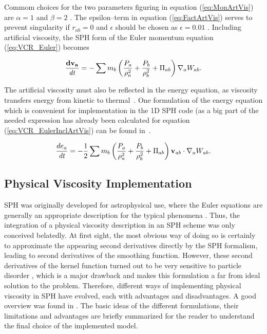 \documentclass{report}
\begin{document}
Commom choices for the two parameters figuring in equation (\ref{eq:MonArtVis}) are $\alpha=1$ and $\beta=2$ \cite{Monaghan1992}. The epsilon--term in equation (\ref{eq:FactArtVis}) serves to prevent singularity if $r_{ab}=0$ and $\epsilon$ should be chosen as $\epsilon=0.01$ \cite{Monaghan1992}.
Including artificial viscosity, the SPH form of the Euler momentum equation (\ref{eq:VCR_Euler}) becomes~\cite{Monaghan2005}

\begin{equation}
\label{eq:VCR_EulerInclArtVis}
\frac{{\bf dv_{a}}}{\mathit{dt}}=-\sum {m_{b}\left(\frac{P_{a}}{\rho_{a}^{2}}+\frac{P_{b}}{\rho _{b}^{2}}+\Pi _{ab}\right)\nabla_{a}W_{ab}}.
\end{equation}

The artificial viscosity must also be reflected in the energy equation, as viscosity 
transfers energy from kinetic to thermal~\cite{Monaghan2005}. One formulation of the 
energy equation which is convenient for implementation in the 1D SPH code (as a big 
part of the needed expression has already been calculated for equation
(\ref{eq:VCR_EulerInclArtVis}) can be found in~\cite{Liu2003}.

\begin{equation}
\label{eq:ECR_EulerInclArtVis}
\frac{de_{a}}{\mathit{dt}}=-\mathit{}\frac{1}{2}\sum{m_{b}\left(\frac{P_{a}}{\rho _{a}^{2}}+\frac{P_{b}}{\rho _{b}^{2}}+\Pi _{ab}\right){\bf v_{\mathit{ab}}}\cdot\nabla _{a}W_{\mathit{ab}}}.
\end{equation}

\subsection{Physical Viscosity Implementation}
\label{sec:PhysViscDescr}

SPH was originally developed for astrophysical use, where the Euler equations are generally an appropriate description for the typical phenomena \cite{Liu2003}. Thus, the integration of a physical viscosity description in an SPH scheme was only conceived belatedly. 
At first sight, the most obvious way of doing so is certainly to approximate the appearing second derivatives directly by the SPH formalism, leading to second derivatives of the smoothing function. However, these second derivatives of the kernel function turned out to be very sensitive to particle disorder \cite{Brookshaw1986,Monaghan1988}, which is a major drawback and makes this formulation a far from ideal solution to the problem. Therefore, different ways of implementing physical viscosity in SPH have evolved, each with advantages and disadvantages. A good overview was found in \cite{Basa2009}. The basic ideas of the different formulations, their limitations and advantages are briefly summarized for the reader to understand the final choice of the implemented model.
\end{document}
